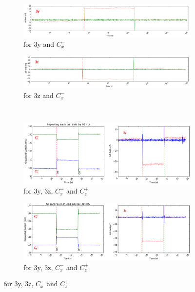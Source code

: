 \begin{figure}[!htb]
    \begin{subfigure}{.5\linewidth}
        \centering
        \includegraphics[width=\linewidth, height= 3 cm]{Images/1s1c3y}
        \caption{for 3y and $C_x^-$ }
        \label{fig:1s1c3y}
    \end{subfigure}%
    \begin{subfigure}{.5\linewidth}
        \centering
        \includegraphics[width=\linewidth, height= 3 cm]{Images/1s1c3z}
        \caption{for 3z and $C_x^-$}
        \label{fig:1s1c3z}
    \end{subfigure}\\[1ex]
    \begin{subfigure}{.5\linewidth}
        \centering
        \includegraphics[width=\linewidth, height= 3 cm]{Images/1s2c3yc1c6}
        \caption{for 3y, 3z, $C_x^-$ and $C_z^+$}
        \label{fig:1s2c3yc1c6}
    \end{subfigure}%
        \begin{subfigure}{.5\linewidth}
        \centering
        \includegraphics[width=\linewidth, height= 3 cm]{Images/1s2c3zc1c6}
        \caption{for 3y, 3z, $C_x^-$ and $C_z^+$}
        \label{fig:1s2c3zc1c6}

\end{subfigure}
\end{figure}
